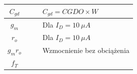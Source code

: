\documentclass[twoside,pl,final]{labman}
\begin{document}
\begin{table}[htbp]
\begin{tabular}{ || c | c | c | p{} || }
    $C_{gd}$                & & & $C_{gd} = CGDO \times W$ \\ \hline
    $g_{m}$                 &             &             & Dla $I_D = 10~\mu{}A$ \\ \hline
    $r_{o}$                 &             &             & Dla $I_D = 10~\mu{}A$ \\ \hline
    $g_mr_o$                &             &             & Wzmocnienie bez obciążenia \\ \hline
    $f_T$                   &             &             & \\
    \hline \hline
  \end{tabular}
\end{table}



\end{document}

